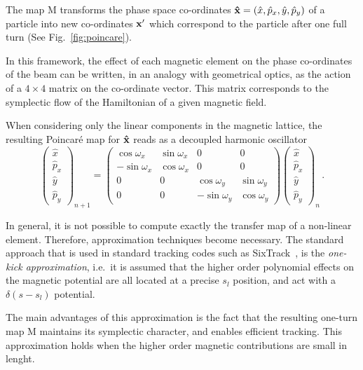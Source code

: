 The map \(\mathrm{M}\) transforms the phase space co-ordinates \(\vb{\hat x} = (\hat x, \hat p_x, \hat y, \hat p_y)\) of a particle into new co-ordinates \(\vb{x}'\) which correspond to the particle after one full turn (See Fig.~\ref{fig:poincare}).

In this framework, the effect of each magnetic element on the phase co-ordinates of the beam can be written, in an analogy with geometrical optics, as the action of a $4\times4$ matrix on the co-ordinate vector. This matrix corresponds to the symplectic flow of the Hamiltonian of a given magnetic field.

When considering only the linear components in the magnetic lattice, the resulting Poincaré map for $\vb{\hat x}$ reads as a decoupled harmonic oscillator
%
\begin{equation} 
	\begin{pmatrix}
		\hat x \\ \hat p_x \\ \hat y \\ \hat p_y 
	\end{pmatrix}_{n+1}
	=
	\begin{pmatrix}
		\cos\omega_x & \sin\omega_x & 0 & 0 \\
		-\sin\omega_x & \cos\omega_x & 0 & 0 \\
		0 & 0 &\cos\omega_y & \sin\omega_y \\
		0 & 0 &-\sin\omega_y & \cos\omega_y
	\end{pmatrix}
	\begin{pmatrix}
		\hat x \\ \hat p_x \\ \hat y \\ \hat p_y 
	\end{pmatrix}_{n}\,.
\end{equation}

In general, it is not possible to compute exactly the transfer map of a non-linear element. Therefore, approximation techniques become necessary. The standard approach that is used in standard tracking codes such as SixTrack~\cite{}, is the \textit{one-kick approximation}, i.e.\ it is assumed that the higher order polynomial effects on the magnetic potential are all located at a precise $s_l$ position, and act with a $\delta(s - s_l)$ potential.

The main advantages of this approximation is the fact that the resulting one-turn map $\mathrm{M}$ maintains its symplectic character, and enables efficient tracking. This approximation holds when the higher order magnetic contributions are small in lenght.

